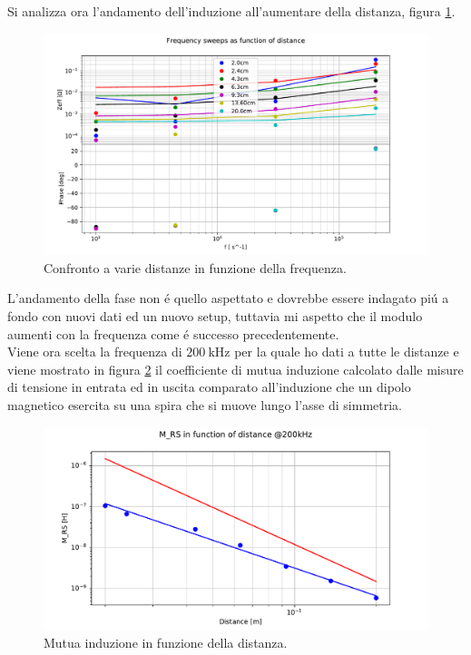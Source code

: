 Si analizza ora l'andamento dell'induzione all'aumentare della distanza, figura \ref{fig:brut}.
\begin{figure}[H]
	\centering
    \includegraphics[width=\textwidth]{Figure_16.pdf}
    
    \caption{Confronto a varie distanze in funzione della frequenza.}
    \label{fig:brut}
\end{figure}
L'andamento della fase non \'e quello aspettato e dovrebbe essere indagato pi\'u a fondo con nuovi dati ed un nuovo setup, tuttavia mi aspetto che il modulo aumenti con la frequenza come \'e successo precedentemente.\\
Viene ora scelta la frequenza di $200\ \si{\kilo\hertz}$ per la quale ho dati a tutte le distanze e viene mostrato in figura \ref{fig:r3} il coefficiente di mutua induzione calcolato dalle misure di tensione in entrata ed in uscita comparato all'induzione che un dipolo magnetico esercita su una spira che si muove lungo l'asse di simmetria.\\
\begin{figure}[h]
	\centering
    \includegraphics[width=\textwidth]{Figure_17.pdf}
    
    \caption{Mutua induzione in funzione della distanza.}
    \label{fig:r3}
\end{figure}
